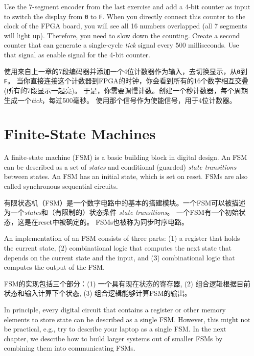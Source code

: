 \documentclass[%
    10pt,
    headinclude, footexclude,
    openright, %
    notitlepage,
    cleardoubleempty,
    headsepline,
    pointlessnumbers,
    bibtotoc, idxtotoc,
    ]{scrbook}
\newcommand{\code}[1]{{\small{\texttt{#1}}}}
\newcommand{\todo}[1]{{\emph{TODO: #1}}}
\renewcommand{\todo}[1]{}
\begin{document}
Use the 7-segment encoder from the last exercise and add a 4-bit counter as input
to switch the display from \code{0} to \code{F}. When you directly connect this
counter to the clock of the FPGA board, you will see all 16 numbers
overlapped (all 7 segments will light up).
Therefore, you need to slow down the counting. Create a second
counter that can generate a single-cycle \emph{tick} signal every 500 milliseconds.
Use that signal as enable signal for the 4-bit counter.

使用来自上一章的7段编码器并添加一个4位计数器作为输入，去切换显示，从\code{0}到\code{F}。
当你直接连接这个计数器到FPGA的时钟，你会看到所有的16个数字相互交叠(所有的7段显示一起亮)。
于是，你需要调慢计数。创建一个秒计数器，每个周期生成一个\emph{tick}，每过500毫秒。
使用那个信号作为使能信号，用于4位计数器。

\todo{Luca: More exercises would be nice. Maybe in the future?}

\chapter{Finite-State Machines}

A finite-state machine (FSM) is a basic building block in digital design.
An FSM can be described as a set of \emph{states} and conditional (guarded)
\emph{state transitions} between states. 
An FSM has an initial state, which is set on reset.
FSMs are also called synchronous sequential circuits.

有限状态机（FSM）是一个数字电路中的基本的搭建模块。一个FSM可以被描述为一个\emph{states}和（有限制的）状态条件
\emph{state transitions}。
一个FSM有一个初始状态，这是在reset中被确定的。
FSMs也被称为同步时序电路。


An implementation of an FSM consists of three parts: (1) a register that holds the current state,
(2) combinational logic that computes the next state that depends on the current
state and the input, and (3) combinational logic that computes the output of the FSM.

FSM的实现包括三个部分：(1) 一个具有现在状态的寄存器,
(2) 组合逻辑根据目前状态和输入计算下个状态,  
(3) 组合逻辑能够计算FSM的输出。

In principle, every digital circuit that contains a register or other memory elements
to store state can be described as a single FSM. However, this might
not be practical, e.g., try to describe your laptop as a single FSM.
In the next chapter, we describe how to build larger systems
out of smaller FSMs by combining them into communicating FSMs.
\end{document}
